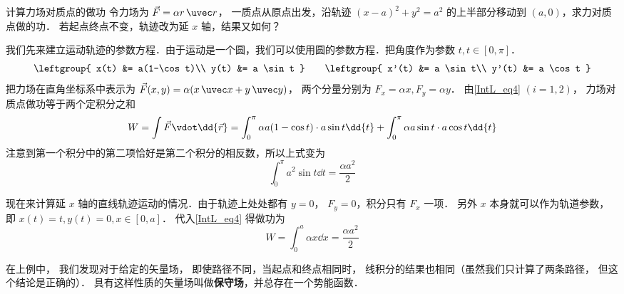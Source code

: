 \begin{exam}{计算力场对质点的做功}\label{IntL_ex1}
令力场为 $\vec F = \alpha r \,\uvec r$， 一质点从原点出发，沿轨迹 $(x-a)^2 + y^2 = a^2$ 的上半部分移动到 $(a,0)$，求力对质点做的功． 若起点终点不变，轨迹改为延 $x$ 轴，结果又如何？

我们先来建立运动轨迹的参数方程．由于运动是一个圆，我们可以使用圆的参数方程．把角度作为参数 $t, t\in [0,\pi]$．
\begin{equation}
\leftgroup{
x(t) &= a(1-\cos t)\\
y(t) &= a \sin t
}
\qquad 
\leftgroup{
x'(t) &= a \sin t\\
y'(t) &= a \cos t
}
\end{equation}
把力场在直角坐标系中表示为 $\vec F(x,y) = \alpha (x\,\uvec x + y\,\uvec y)$， 两个分量分别为 $F_x = \alpha x, F_y = \alpha y$． 由\autoref{IntL_eq4} $(i=1,2)$， 力场对质点做功等于两个定积分之和
\begin{equation}
W = \int \vec F \vdot \dd{\vec r} =\int_0^\pi \alpha a(1-\cos t) \cdot a \sin t \dd{t} + \int_0^\pi \alpha a \sin t \cdot a \cos t \dd{t}
\end{equation}
注意到第一个积分中的第二项恰好是第二个积分的相反数，所以上式变为
\begin{equation}
\int_0^\pi a^2 \sin t \dd{t} = \frac{\alpha a^2}{2}
\end{equation}

现在来计算延 $x$ 轴的直线轨迹运动的情况．由于轨迹上处处都有 $y=0$， $F_y = 0$，积分只有 $F_x$ 一项． 另外 $x$ 本身就可以作为轨道参数，即 $x(t) = t, y(t) = 0, x\in [0,a]$． 代入\autoref{IntL_eq4} 得做功为
\begin{equation}
W = \int_0^a \alpha x \dd{x} = \frac{\alpha a^2}{2}
\end{equation}
\end{exam}

在上例中， 我们发现对于给定的矢量场， 即使路径不同，当起点和终点相同时， 线积分的结果也相同（虽然我们只计算了两条路径， 但这个结论是正确的）． 具有这样性质的矢量场叫做\textbf{保守场}，并总存在一个势能函数． 




